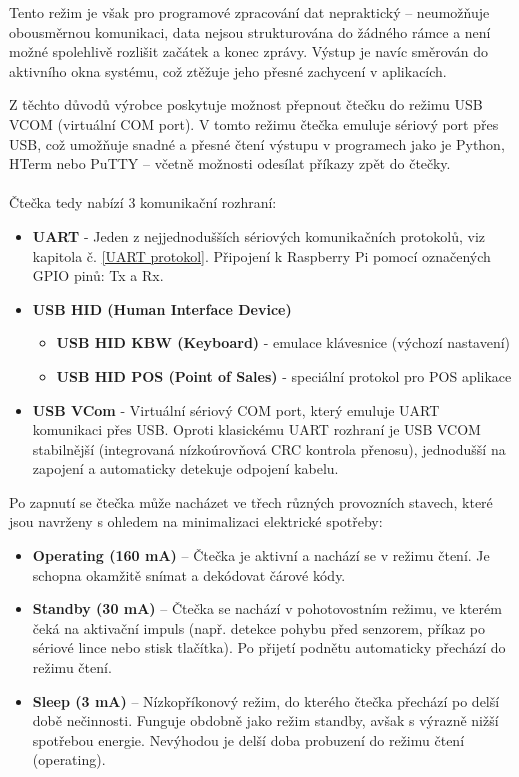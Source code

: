 Tento režim je však pro programové zpracování dat nepraktický – neumožňuje obousměrnou komunikaci, data nejsou strukturována do žádného rámce a není možné spolehlivě rozlišit začátek a konec zprávy. Výstup je navíc směrován do aktivního okna systému, což ztěžuje jeho přesné zachycení v aplikacích.

Z těchto důvodů výrobce poskytuje možnost přepnout čtečku do režimu USB VCOM (virtuální COM port). V tomto režimu čtečka emuluje sériový port přes USB, což umožňuje snadné a přesné čtení výstupu v programech jako je Python, HTerm nebo PuTTY – včetně možnosti odesílat příkazy zpět do čtečky.
\\\\
Čtečka tedy nabízí 3 komunikační rozhraní:
\begin{itemize}
    \item \textbf{UART} - Jeden z nejjednodušších sériových komunikačních protokolů, viz kapitola č. \ref{UART protokol}. Připojení k Raspberry Pi pomocí označených GPIO pinů: Tx a Rx. 
    \item \textbf{USB HID (Human Interface Device)}
    \begin{itemize}
        \item \textbf{USB HID KBW (Keyboard)} - emulace klávesnice (výchozí nastavení)
        \item \textbf{USB HID POS (Point of Sales)} - speciální protokol pro POS aplikace 
    \end{itemize}
    \item \textbf{USB VCom} - Virtuální sériový COM port, který emuluje UART komunikaci přes USB. Oproti klasickému UART rozhraní je USB VCOM stabilnější (integrovaná nízkoúrovňová CRC kontrola přenosu), jednodušší na zapojení a automaticky detekuje odpojení kabelu.
\end{itemize}
\bigskip
Po zapnutí se čtečka může nacházet ve třech různých provozních stavech, které jsou navrženy s ohledem na minimalizaci elektrické spotřeby:
\begin{itemize}
    \item \textbf{Operating (160 mA)} – Čtečka je aktivní a nachází se v režimu čtení. Je schopna okamžitě snímat a dekódovat čárové kódy.
    \item \textbf{Standby (30 mA)} – Čtečka se nachází v pohotovostním režimu, ve kterém čeká na aktivační impuls (např. detekce pohybu před senzorem, příkaz po sériové lince nebo stisk tlačítka). Po přijetí podnětu automaticky přechází do režimu čtení.
    \item \textbf{Sleep (3 mA)} – Nízkopříkonový režim, do kterého čtečka přechází po delší době nečinnosti. Funguje obdobně jako režim standby, avšak s výrazně nižší spotřebou energie. Nevýhodou je delší doba probuzení do režimu čtení (operating).
\end{itemize}
